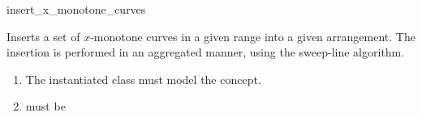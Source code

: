 \ccRefPageBegin

\begin{ccRefFunction}{insert_x_monotone_curves}

\ccDefinition

Inserts a set of $x$-monotone curves in a given range into a given
arrangement. The insertion is performed in an aggregated manner, using
the sweep-line algorithm.



\begin{enumerate}
\item The instantiated  class must model the
   concept.
\item {} must be 
\end{enumerate}

\end{ccRefFunction}

\ccRefPageEnd
